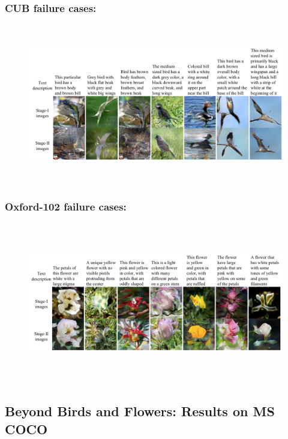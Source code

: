 \documentclass[a4paper,12pt,oneside]{article}
\begin{document}
        \subsubsection{CUB failure cases:}
        \begin{figure}[H]
          \centering
          \includegraphics[height=7cm,width=15cm]{Figure13.png}
          \end{figure}
        \subsubsection{Oxford-102 failure cases:}
        \begin{figure}[H]
          \centering
          \includegraphics[height=7cm,width=15cm]{Figure14.png}
          \end{figure}
\subsection{Beyond Birds and Flowers: Results on MS COCO}
\end{document}
